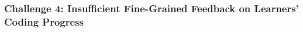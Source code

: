 


\subsubsection{\textbf{Challenge 4: Insufficient Fine-Grained Feedback on Learners' Coding Progress}}

